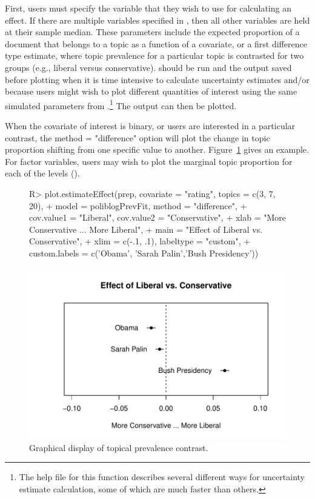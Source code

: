 \documentclass[article,shortnames]{jss}
\begin{document}
First, users must specify the variable that they wish to use for calculating an effect. If there are multiple variables specified in , then all other variables are held at their sample median. These parameters include the expected proportion of a document that belongs to a topic as a function of a covariate, or a first difference type estimate, where topic prevalence for a particular topic is contrasted for two groups (e.g., liberal versus conservative).   should be run and the output saved before plotting when it is time intensive to calculate uncertainty estimates and/or because users might wish to plot different quantities of interest using the same simulated parameters from .\footnote{The help file for this function describes several different ways for uncertainty estimate calculation, some of which are much faster than others.} The output can then be plotted. %


When the covariate of interest is binary, or users are interested in a particular contrast, the method = "difference" option will plot the change in topic proportion shifting from one specific value to another. Figure~\ref{fig:difference} gives an example. For factor variables, users may wish to plot the marginal topic proportion for each of the levels ().


\begin{figure}
\begin{center}
\begin{Schunk}
\begin{Sinput}
R> plot.estimateEffect(prep, covariate = "rating", topics = c(3, 7, 20),
+  model = poliblogPrevFit, method = "difference",
+  cov.value1 = "Liberal", cov.value2 = "Conservative",
+  xlab = "More Conservative ... More Liberal",
+  main = "Effect of Liberal vs. Conservative",
+  xlim = c(-.1, .1), labeltype = "custom",
+  custom.labels = c('Obama', 'Sarah Palin','Bush Presidency'))
\end{Sinput}
\end{Schunk}
\includegraphics{stmVignette-017}
\caption{Graphical display of topical prevalence contrast.}
\label{fig:difference}
\end{center}
\end{figure}
\end{document}
